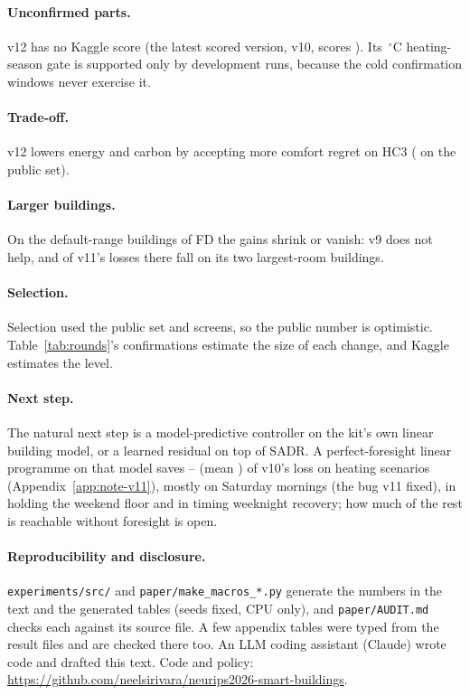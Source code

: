 \documentclass{article}
\begin{document}
\paragraph{Unconfirmed parts.} v12 has no Kaggle score (the latest scored version, v10, scores \REigKagVTen). Its \RTenSeasonOatC\,$^\circ$C heating-season gate is supported only by development runs, because the cold confirmation windows never exercise it.

\paragraph{Trade-off.} v12 lowers energy and carbon by accepting \RTenComfRiseHCThree{} more comfort regret on HC3 (\RTenComfRisePub{} on the public set).

\paragraph{Larger buildings.} On the default-range buildings of FD the gains shrink or vanish: v9 does not help, and \RNineFDTopTwoLosses{} of v11's \RNineConfFreshDefLosses{} losses there fall on its two largest-room buildings.

\paragraph{Selection.} Selection used the public set and screens, so the public number is optimistic. Table~\ref{tab:rounds}'s confirmations estimate the size of each change, and Kaggle estimates the level.

\paragraph{Next step.} The natural next step is a model-predictive controller on the kit's own linear building model, or a learned residual on top of SADR. A perfect-foresight linear programme on that model saves \RElvLpMin--\RElvLpMax{} (mean \RElvLpMean) of v10's loss on \RElvLpN{} heating scenarios (Appendix~\ref{app:note-v11}), mostly on Saturday mornings (the bug v11 fixed), in holding the weekend floor and in timing weeknight recovery; how much of the rest is reachable without foresight is open.

\paragraph{Reproducibility and disclosure.} \texttt{experiments/src/} and \texttt{paper/make\_macros\_*.py} generate the numbers in the text and the generated tables (seeds fixed, CPU only), and \texttt{paper/AUDIT.md} checks each against its source file. A few appendix tables were typed from the result files and are checked there too. An LLM coding assistant (Claude) wrote code and drafted this text. Code and policy: \url{https://github.com/neelsirivara/neurips2026-smart-buildings}.


\end{document}
